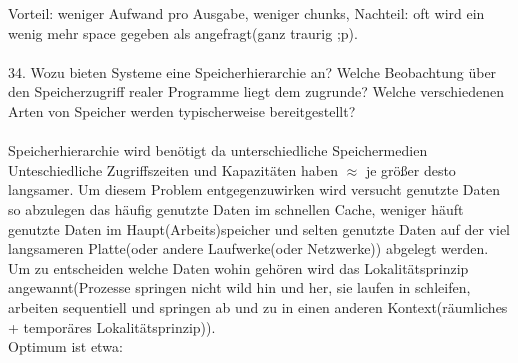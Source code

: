 \documentclass{article}
\begin{document}
Vorteil: weniger Aufwand pro Ausgabe, weniger chunks, Nachteil: oft wird ein wenig mehr space gegeben als angefragt(ganz traurig ;p).
\\
\\
34. Wozu bieten Systeme eine Speicherhierarchie an? Welche Beobachtung über den Speicherzugriff realer Programme liegt dem zugrunde? Welche verschiedenen Arten von Speicher
werden typischerweise bereitgestellt?
\\
\\
Speicherhierarchie wird ben\"otigt da unterschiedliche Speichermedien Unteschiedliche Zugriffszeiten und Kapazit\"aten haben $\approx$ je gr\"o\ss er desto langsamer.
Um diesem Problem entgegenzuwirken wird versucht genutzte Daten so abzulegen das h\"aufig genutzte Daten im schnellen Cache, weniger h\"auft genutzte Daten im Haupt(Arbeits)speicher und selten genutzte Daten auf der viel langsameren Platte(oder andere Laufwerke(oder Netzwerke)) abgelegt werden. Um zu entscheiden welche Daten wohin geh\"oren wird das Lokalit\"atsprinzip angewannt(Prozesse springen nicht wild hin und her, sie laufen in schleifen, arbeiten sequentiell und springen ab und zu in einen anderen Kontext(r\"aumliches + tempor\"ares Lokalit\"atsprinzip)).\\
Optimum ist etwa:
\end{document}

